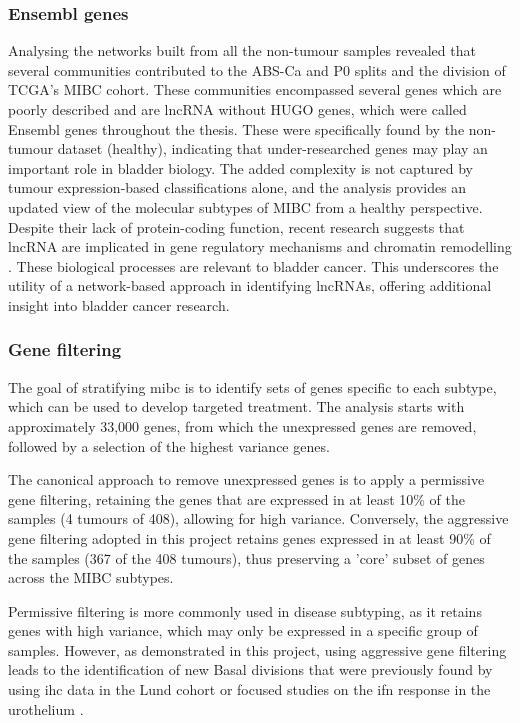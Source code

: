 \subsubsection*{Ensembl genes}

Analysing the networks built from all the non-tumour samples revealed that several communities contributed to the ABS-Ca and P0 splits and the division of TCGA's MIBC cohort. These communities encompassed several genes which are poorly described and are \acrlong{lncRNA} without HUGO genes, which were called Ensembl genes throughout the thesis. These were specifically found by the non-tumour dataset (healthy), indicating that under-researched genes may play an important role in bladder biology. The added complexity is not captured by tumour expression-based classifications alone, and the analysis provides an updated view of the molecular subtypes of MIBC from a healthy perspective. Despite their lack of protein-coding function, recent research suggests that \acrlong{lncRNA} are implicated in gene regulatory mechanisms and chromatin remodelling \citep{Statello2021-md}. These biological processes are relevant to bladder cancer. This underscores the utility of a network-based approach in identifying lncRNAs, offering additional insight into bladder cancer research.


\subsubsection*{Gene filtering} \label{s:discussion:gene_filt}

The goal of stratifying \acrshort{mibc} is to identify sets of genes specific to each subtype, which can be used to develop targeted treatment. The analysis starts with approximately 33,000 genes, from which the unexpressed genes are removed, followed by a selection of the highest variance genes.

The canonical approach to remove unexpressed genes is to apply a permissive gene filtering, retaining the genes that are expressed in at least 10\% of the samples (4 tumours of 408), allowing for high variance. Conversely, the aggressive gene filtering adopted in this project retains genes expressed in at least 90\% of the samples (367 of the 408 tumours), thus preserving a 'core' subset of genes across the \gls{MIBC} subtypes.

Permissive filtering is more commonly used in disease subtyping, as it retains genes with high variance, which may only be expressed in a specific group of samples. However, as demonstrated in this project, using aggressive gene filtering leads to the identification of new Basal divisions that were previously found by using \acrshort{ihc} data in the Lund cohort \citep{Marzouka2018-ge} or focused studies on the \acrshort{ifn} response in the urothelium \citep{Baker2022-bj}.

